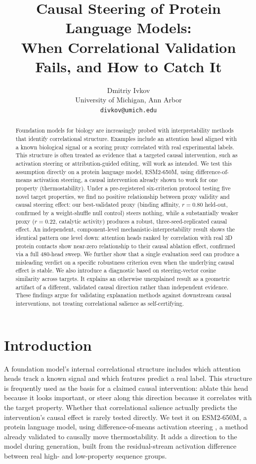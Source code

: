 \documentclass{article}
\title{Causal Steering of Protein Language Models: \\
When Correlational Validation Fails, and How to Catch It}
\author{%
  Dmitriy Ivkov \\
  University of Michigan, Ann Arbor \\
  \texttt{divkov@umich.edu}
}
\begin{document}
\maketitle

\begin{abstract}
Foundation models for biology are increasingly probed with
interpretability methods that identify correlational structure. Examples
include an attention head aligned with a known biological signal or a
scoring proxy correlated with real experimental labels. This structure is
often treated as evidence that a targeted causal intervention, such as
activation steering or attribution-guided editing, will work as intended.
We test this
assumption directly on a protein language model, ESM2-650M, using
difference-of-means activation steering, a causal intervention already
shown to work for one property (thermostability). Under a pre-registered
six-criterion protocol testing five novel target properties, we find no
positive relationship between proxy validity and causal steering effect:
our best-validated proxy (binding affinity, $r=0.80$ held-out, confirmed
by a weight-shuffle null control) steers nothing, while a substantially
weaker proxy ($r=0.22$, catalytic activity) produces a robust,
three-seed-replicated causal effect. An independent, component-level
mechanistic-interpretability result shows the identical pattern one level
down: attention heads ranked by correlation with real 3D protein contacts
show near-zero relationship to their causal ablation effect, confirmed
via a full 480-head sweep. We further show that a single evaluation seed
can produce a misleading verdict on a specific robustness criterion even
when the underlying causal effect is stable. We also introduce a
diagnostic based on steering-vector cosine similarity across targets. It
explains an otherwise unexplained result as a geometric artifact of a
different, validated causal direction rather than independent evidence. These
findings argue for validating explanation methods against downstream
causal interventions, not treating correlational salience as
self-certifying.
\end{abstract}

\section{Introduction}

A foundation model's internal correlational structure includes which
attention heads track a known signal and which features predict a real
label. This structure is frequently used as the basis for a claimed
causal intervention: ablate this head because it looks important, or
steer along this direction because it correlates with the target
property. Whether that correlational
salience actually predicts the intervention's causal effect is rarely
tested directly. We test it on ESM2-650M, a protein language model, using
difference-of-means activation steering \citep{huang2025steering}, a
method already validated to causally move thermostability. It adds a
direction to the model during generation, built from the residual-stream
activation difference between real high- and low-property sequence
groups.
\end{document}
